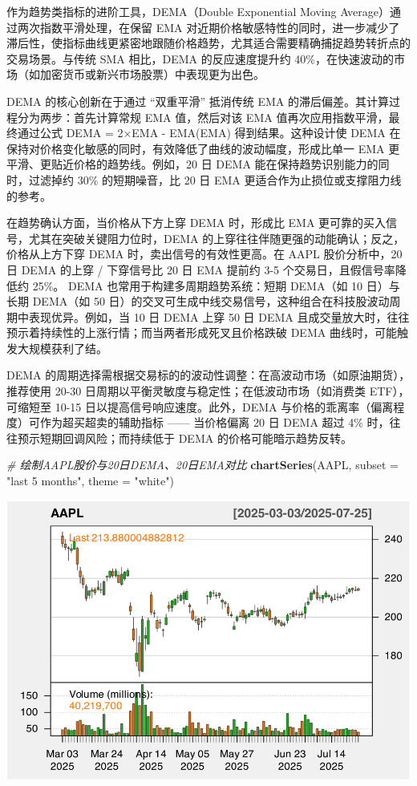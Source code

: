 \documentclass[]{ctexbook}
\newenvironment{Shaded}{\begin{snugshade}}{\end{snugshade}}
\newcommand{\AttributeTok}[1]{\textcolor[rgb]{0.13,0.29,0.53}{#1}}
\newcommand{\CommentTok}[1]{\textcolor[rgb]{0.56,0.35,0.01}{\textit{#1}}}
\newcommand{\FunctionTok}[1]{\textcolor[rgb]{0.13,0.29,0.53}{\textbf{#1}}}
\newcommand{\NormalTok}[1]{#1}
\newcommand{\StringTok}[1]{\textcolor[rgb]{0.31,0.60,0.02}{#1}}
\begin{document}
作为趋势类指标的进阶工具，DEMA（Double Exponential Moving Average）通过两次指数平滑处理，在保留 EMA 对近期价格敏感特性的同时，进一步减少了滞后性，使指标曲线更紧密地跟随价格趋势，尤其适合需要精确捕捉趋势转折点的交易场景。与传统 SMA 相比，DEMA 的反应速度提升约 40\%，在快速波动的市场（如加密货币或新兴市场股票）中表现更为出色。

DEMA 的核心创新在于通过 ``双重平滑'' 抵消传统 EMA 的滞后偏差。其计算过程分为两步：首先计算常规 EMA 值，然后对该 EMA 值再次应用指数平滑，最终通过公式 DEMA = 2×EMA - EMA(EMA) 得到结果。这种设计使 DEMA 在保持对价格变化敏感的同时，有效降低了曲线的波动幅度，形成比单一 EMA 更平滑、更贴近价格的趋势线。例如，20 日 DEMA 能在保持趋势识别能力的同时，过滤掉约 30\% 的短期噪音，比 20 日 EMA 更适合作为止损位或支撑阻力线的参考。

在趋势确认方面，当价格从下方上穿 DEMA 时，形成比 EMA 更可靠的买入信号，尤其在突破关键阻力位时，DEMA 的上穿往往伴随更强的动能确认；反之，价格从上方下穿 DEMA 时，卖出信号的有效性更高。在 AAPL 股价分析中，20 日 DEMA 的上穿 / 下穿信号比 20 日 EMA 提前约 3-5 个交易日，且假信号率降低约 25\%。
DEMA 也常用于构建多周期趋势系统：短期 DEMA（如 10 日）与长期 DEMA（如 50 日）的交叉可生成中线交易信号，这种组合在科技股波动周期中表现优异。例如，当 10 日 DEMA 上穿 50 日 DEMA 且成交量放大时，往往预示着持续性的上涨行情；而当两者形成死叉且价格跌破 DEMA 曲线时，可能触发大规模获利了结。

DEMA 的周期选择需根据交易标的的波动性调整：在高波动市场（如原油期货），推荐使用 20-30 日周期以平衡灵敏度与稳定性；在低波动市场（如消费类 ETF），可缩短至 10-15 日以提高信号响应速度。此外，DEMA 与价格的乖离率（偏离程度）可作为超买超卖的辅助指标 ------ 当价格偏离 20 日 DEMA 超过 4\% 时，往往预示短期回调风险；而持续低于 DEMA 的价格可能暗示趋势反转。

\begin{Shaded}
\begin{Highlighting}[]
\CommentTok{\# 绘制AAPL股价与20日DEMA、20日EMA对比}
\FunctionTok{chartSeries}\NormalTok{(AAPL, }\AttributeTok{subset =} \StringTok{"last 5 months"}\NormalTok{, }\AttributeTok{theme =} \StringTok{"white"}\NormalTok{)}
\end{Highlighting}
\end{Shaded}

\includegraphics[width=0.9\linewidth]{QuantmodHandbook_files/figure-latex/dema-1}
\end{document}
